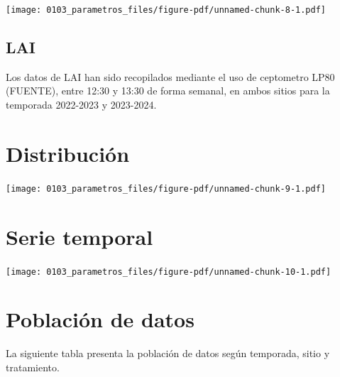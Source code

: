 \documentclass[
  letterpaper,
  DIV=11,
  numbers=noendperiod]{scrreprt}
\begin{document}
\begin{center}
\texttt{[image: 0103\_parametros\_files/figure-pdf/unnamed-chunk-8-1.pdf]}
\end{center}

\section{LAI}\label{lai}

Los datos de LAI han sido recopilados mediante el uso de ceptometro LP80
(FUENTE), entre 12:30 y 13:30 de forma semanal, en ambos sitios para la
temporada 2022-2023 y 2023-2024.

\chapter{Distribución}

\begin{center}
\texttt{[image: 0103\_parametros\_files/figure-pdf/unnamed-chunk-9-1.pdf]}
\end{center}

\chapter{Serie temporal}

\begin{center}
\texttt{[image: 0103\_parametros\_files/figure-pdf/unnamed-chunk-10-1.pdf]}
\end{center}

\chapter{Población de datos}

La siguiente tabla presenta la población de datos según temporada, sitio
y tratamiento.
\end{document}
